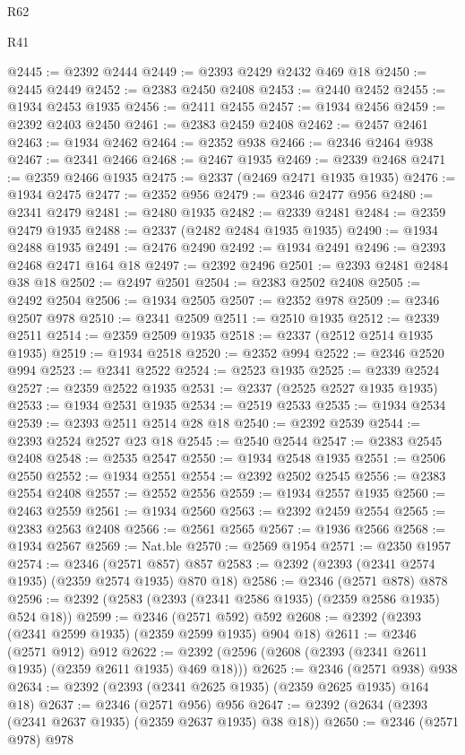 \begin{lexlean}{R62}
\begin{lexlean}{R41}
\begin{coremodule}
{{{{{{{{{{{{{{{{{{{{{{{{{{{{{{{{{{{{{{{{{{{{{{{{{{{{{{{{{{{{{{{{{{{{{{{{{{{{{{{{{{{{{{{@2445 := @2392 @2444
@2449 := @2393 @2429 @2432 @469 @18
@2450 := @2445 @2449
@2452 := @2383 @2450 @2408
@2453 := @2440 @2452
@2455 := @1934 @2453 @1935
@2456 := @2411 @2455
@2457 := @1934 @2456
@2459 := @2392 @2403 @2450
@2461 := @2383 @2459 @2408
@2462 := @2457 @2461
@2463 := @1934 @2462
@2464 := @2352 @938
@2466 := @2346 @2464 @938
@2467 := @2341 @2466
@2468 := @2467 @1935
@2469 := @2339 @2468
@2471 := @2359 @2466 @1935
@2475 := @2337 (@2469 @2471 @1935 @1935)
@2476 := @1934 @2475
@2477 := @2352 @956
@2479 := @2346 @2477 @956
@2480 := @2341 @2479
@2481 := @2480 @1935
@2482 := @2339 @2481
@2484 := @2359 @2479 @1935
@2488 := @2337 (@2482 @2484 @1935 @1935)
@2490 := @1934 @2488 @1935
@2491 := @2476 @2490
@2492 := @1934 @2491
@2496 := @2393 @2468 @2471 @164 @18
@2497 := @2392 @2496
@2501 := @2393 @2481 @2484 @38 @18
@2502 := @2497 @2501
@2504 := @2383 @2502 @2408
@2505 := @2492 @2504
@2506 := @1934 @2505
@2507 := @2352 @978
@2509 := @2346 @2507 @978
@2510 := @2341 @2509
@2511 := @2510 @1935
@2512 := @2339 @2511
@2514 := @2359 @2509 @1935
@2518 := @2337 (@2512 @2514 @1935 @1935)
@2519 := @1934 @2518
@2520 := @2352 @994
@2522 := @2346 @2520 @994
@2523 := @2341 @2522
@2524 := @2523 @1935
@2525 := @2339 @2524
@2527 := @2359 @2522 @1935
@2531 := @2337 (@2525 @2527 @1935 @1935)
@2533 := @1934 @2531 @1935
@2534 := @2519 @2533
@2535 := @1934 @2534
@2539 := @2393 @2511 @2514 @28 @18
@2540 := @2392 @2539
@2544 := @2393 @2524 @2527 @23 @18
@2545 := @2540 @2544
@2547 := @2383 @2545 @2408
@2548 := @2535 @2547
@2550 := @1934 @2548 @1935
@2551 := @2506 @2550
@2552 := @1934 @2551
@2554 := @2392 @2502 @2545
@2556 := @2383 @2554 @2408
@2557 := @2552 @2556
@2559 := @1934 @2557 @1935
@2560 := @2463 @2559
@2561 := @1934 @2560
@2563 := @2392 @2459 @2554
@2565 := @2383 @2563 @2408
@2566 := @2561 @2565
@2567 := @1936 @2566
@2568 := @1934 @2567
@2569 := Nat.ble
@2570 := @2569 @1954
@2571 := @2350 @1957
@2574 := @2346 (@2571 @857) @857
@2583 := @2392 (@2393 (@2341 @2574 @1935) (@2359 @2574 @1935) @870 @18)
@2586 := @2346 (@2571 @878) @878
@2596 := @2392 (@2583 (@2393 (@2341 @2586 @1935) (@2359 @2586 @1935) @524 @18))
@2599 := @2346 (@2571 @592) @592
@2608 := @2392 (@2393 (@2341 @2599 @1935) (@2359 @2599 @1935) @904 @18)
@2611 := @2346 (@2571 @912) @912
@2622 := @2392 (@2596 (@2608 (@2393 (@2341 @2611 @1935) (@2359 @2611 @1935) @469 @18)))
@2625 := @2346 (@2571 @938) @938
@2634 := @2392 (@2393 (@2341 @2625 @1935) (@2359 @2625 @1935) @164 @18)
@2637 := @2346 (@2571 @956) @956
@2647 := @2392 (@2634 (@2393 (@2341 @2637 @1935) (@2359 @2637 @1935) @38 @18))
@2650 := @2346 (@2571 @978) @978
}}}}}}}}}}}}}}}}}}}}}}}}}}}}}}}}}}}}}}}}}}}}}}}}}}}}}}}}}}}}}}}}}}}}}}}}}}}}}}}}}}}}}}}
\end{coremodule}
\end{lexlean}
\end{lexlean}
